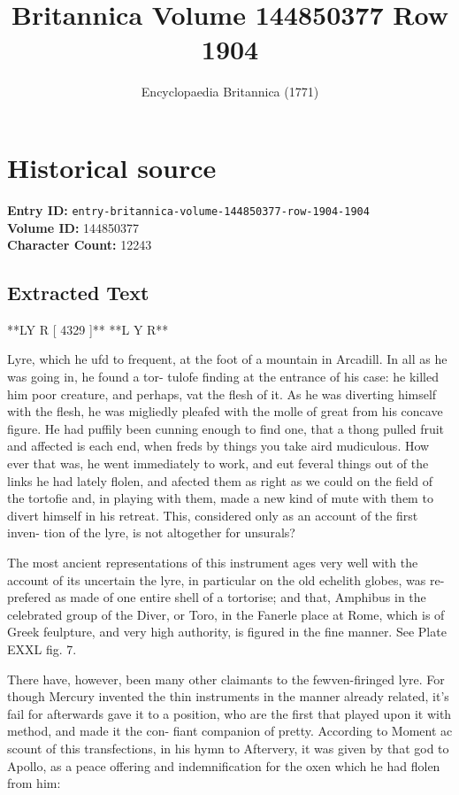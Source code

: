 \documentclass{article}
\title{Britannica Volume 144850377 Row 1904}
\date{Encyclopaedia Britannica (1771)}
\begin{document}
\maketitle

\section*{Historical source}
\textbf{Entry ID:} \texttt{entry-britannica-volume-144850377-row-1904-1904} \\
\textbf{Volume ID:} 144850377 \\
\textbf{Character Count:} 12243

\subsection*{Extracted Text}
**LY R [ 4329 ]** **L Y R**

Lyre, which he ufd to frequent, at the foot of a mountain in Arcadill. In all as he was going in, he found a tor- tulofe finding at the entrance of his case: he killed him poor creature, and perhaps, vat the flesh of it. As he was diverting himself with the flesh, he was migliedly pleafed with the molle of great from his concave figure. He had puffily been cunning enough to find one, that a thong pulled fruit and affected is each end, when freds by things you take aird mudiculous. How ever that was, he went immediately to work, and eut feveral things out of the links he had lately flolen, and afected them as right as we could on the field of the tortofie and, in playing with them, made a new kind of mute with them to divert himself in his retreat. This, considered only as an account of the first inven- tion of the lyre, is not altogether for unsurals?

The most ancient representations of this instrument ages very well with the account of its uncertain the lyre, in particular on the old echelith globes, was re- prefered as made of one entire shell of a tortorise; and that, Amphibus in the celebrated group of the Diver, or Toro, in the Fanerle place at Rome, which is of Greek feulpture, and very high authority, is figured in the fine manner. See Plate EXXL fig. 7.

There have, however, been many other claimants to the fewven-firinged lyre. For though Mercury invented the thin instruments in the manner already related, it's fail for afterwards gave it to a position, who are the first that played upon it with method, and made it the con- fiant companion of pretty. According to Moment ac scount of this transfections, in his hymn to Aftervery, it was given by that god to Apollo, as a peace offering and indemnification for the oxen which he had flolen from him:
\end{document}
